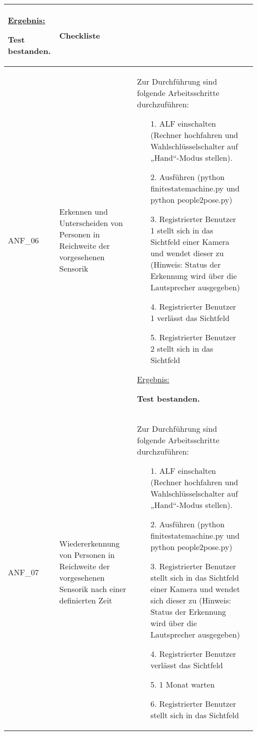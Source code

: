 \documentclass[12pt,a4paper,oneside,numbers=noenddot,captions=tableheading,toc=bibliography,openany,tikz,margin=5mm]{scrbook}
\begin{document}
\begin{longtable}{|p{}|p{}|p{7cm}|p{}|}
\begin{itemize}
\end{itemize}
\underline{Ergebnis:}\newline

\textbf{Test bestanden.} %
& 	Checkliste
\\
	\hline

ANF\_$06$ & Erkennen und Unterscheiden von Personen in Reichweite der vorgesehenen Sensorik & Zur Durchführung sind folgende Arbeitsschritte durchzuführen:
\begin{itemize}
	
	\item[1.]	ALF einschalten (Rechner hochfahren und Wahlschlüsselschalter auf „Hand“-Modus stellen).
	\item[2.]	Ausführen (python finitestatemachine.py und python people2pose.py)
	\item[3.]	Registrierter Benutzer 1 stellt sich in das Sichtfeld einer Kamera und wendet dieser zu (Hinweis: Status der Erkennung wird über die Lautsprecher ausgegeben)
	\item[4.]	Registrierter Benutzer 1 verlässt das Sichtfeld
	\item[5.]	Registrierter Benutzer 2 stellt sich in das Sichtfeld 
	
	
\end{itemize}

\underline{Ergebnis:}\newline
\newline

\textbf{Test bestanden.}	%
& 
\\
\hline

ANF\_$07$ & Wiedererkennung von Personen in Reichweite der vorgesehenen Sensorik nach einer definierten Zeit & Zur Durchführung sind folgende Arbeitsschritte durchzuführen:
\begin{itemize}
	\item[1.]	ALF einschalten (Rechner hochfahren und Wahlschlüsselschalter auf „Hand“-Modus stellen).
\item[2.]	Ausführen (python finitestatemachine.py und python people2pose.py)
\item[3.]   Registrierter Benutzer stellt sich in das Sichtfeld einer Kamera und wendet sich dieser zu (Hinweis: Status der Erkennung wird über die Lautsprecher ausgegeben)
\item[4.]	Registrierter Benutzer verlässt das Sichtfeld
\item[5.]   1 Monat warten
\item[6.]	Registrierter Benutzer stellt sich in das Sichtfeld 
	

\end{itemize}
\end{longtable}
\end{document}

